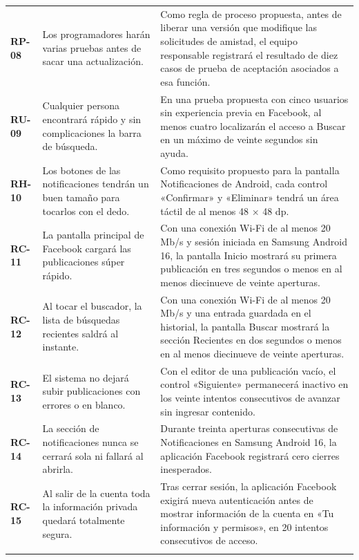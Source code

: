 \documentclass[11pt,a4paper]{article}
\begin{document}
{\begin{longtable}{@{}p{1.0cm}p{5.4cm}p{9.8cm}@{}}
\textbf{RP-08} & Los programadores harán varias pruebas antes de sacar una actualización. & Como regla de proceso propuesta, antes de liberar una versión que modifique las solicitudes de amistad, el equipo responsable registrará el resultado de diez casos de prueba de aceptación asociados a esa función.\\\addlinespace[2.5pt]
\textbf{RU-09} & Cualquier persona encontrará rápido y sin complicaciones la barra de búsqueda. & En una prueba propuesta con cinco usuarios sin experiencia previa en Facebook, al menos cuatro localizarán el acceso a Buscar en un máximo de veinte segundos sin ayuda.\\\addlinespace[2.5pt]
\textbf{RH-10} & Los botones de las notificaciones tendrán un buen tamaño para tocarlos con el dedo. & Como requisito propuesto para la pantalla Notificaciones de Android, cada control «Confirmar» y «Eliminar» tendrá un área táctil de al menos 48 $\times$ 48 dp.\\\addlinespace[2.5pt]
\textbf{RC-11} & La pantalla principal de Facebook cargará las publicaciones súper rápido. & Con una conexión Wi-Fi de al menos 20 Mb/s y sesión iniciada en Samsung Android 16, la pantalla Inicio mostrará su primera publicación en tres segundos o menos en al menos diecinueve de veinte aperturas.\\\addlinespace[2.5pt]
\textbf{RC-12} & Al tocar el buscador, la lista de búsquedas recientes saldrá al instante. & Con una conexión Wi-Fi de al menos 20 Mb/s y una entrada guardada en el historial, la pantalla Buscar mostrará la sección Recientes en dos segundos o menos en al menos diecinueve de veinte aperturas.\\\addlinespace[2.5pt]
\textbf{RC-13} & El sistema no dejará subir publicaciones con errores o en blanco. & Con el editor de una publicación vacío, el control «Siguiente» permanecerá inactivo en los veinte intentos consecutivos de avanzar sin ingresar contenido.\\\addlinespace[2.5pt]
\textbf{RC-14} & La sección de notificaciones nunca se cerrará sola ni fallará al abrirla. & Durante treinta aperturas consecutivas de Notificaciones en Samsung Android 16, la aplicación Facebook registrará cero cierres inesperados.\\\addlinespace[2.5pt]
\textbf{RC-15} & Al salir de la cuenta toda la información privada quedará totalmente segura. & Tras cerrar sesión, la aplicación Facebook exigirá nueva autenticación antes de mostrar información de la cuenta en «Tu información y permisos», en 20 intentos consecutivos de acceso.\\\addlinespace[2.5pt]
\bottomrule\end{longtable}}
\end{document}
